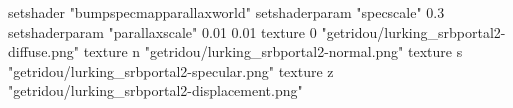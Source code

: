 setshader "bumpspecmapparallaxworld"
setshaderparam "specscale" 0.3
setshaderparam "parallaxscale" 0.01 0.01
texture 0 "getridou/lurking_srbportal2-diffuse.png"
texture n "getridou/lurking_srbportal2-normal.png"
texture s "getridou/lurking_srbportal2-specular.png"
texture z "getridou/lurking_srbportal2-displacement.png"